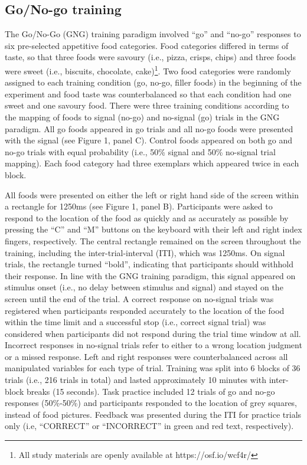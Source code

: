 \documentclass[man,floatsintext]{apa6}
\let\rmarkdownfootnote\footnote%
\def\footnote{\protect\rmarkdownfootnote}
\begin{document}
\hypertarget{gng}{%
\subsection{Go/No-go training}\label{gng}}

\par

The Go/No-Go (GNG) training paradigm involved \enquote{go} and \enquote{no-go} responses to six pre-selected appetitive food categories. Food categories differed in terms of taste, so that three foods were savoury (i.e., pizza, crisps, chips) and three foods were sweet (i.e., biscuits, chocolate, cake)\footnote{All study materials are openly available at https://osf.io/wcf4r/}. Two food categories were randomly assigned to each training condition (go, no-go, filler foods) in the beginning of the experiment and food taste was counterbalanced so that each condition had one sweet and one savoury food. There were three training conditions according to the mapping of foods to signal (no-go) and no-signal (go) trials in the GNG paradigm. All go foods appeared in go trials and all no-go foods were presented with the signal (see Figure 1, panel C). Control foods appeared on both go and no-go trials with equal probability (i.e., 50\% signal and 50\% no-signal trial mapping). Each food category had three exemplars which appeared twice in each block.

\par

All foods were presented on either the left or right hand side of the screen within a rectangle for 1250ms (see Figure 1, panel B). Participants were asked to respond to the location of the food as quickly and as accurately as possible by pressing the \enquote{C} and \enquote{M} buttons on the keyboard with their left and right index fingers, respectively. The central rectangle remained on the screen throughout the training, including the inter-trial-interval (ITI), which was 1250ms. On signal trials, the rectangle turned \enquote{bold}, indicating that participants should withhold their response. In line with the GNG training paradigm, this signal appeared on stimulus onset (i.e., no delay between stimulus and signal) and stayed on the screen until the end of the trial. A correct response on no-signal trials was registered when participants responded accurately to the location of the food within the time limit and a successful stop (i.e., correct signal trial) was considered when participants did not respond during the trial time window at all. Incorrect responses in no-signal trials refer to either to a wrong location judgment or a missed response.
Left and right responses were counterbalanced across all manipulated variables for each type of trial. Training was split into 6 blocks of 36 trials (i.e., 216 trials in total) and lasted approximately 10 minutes with inter-block breaks (15 seconds). Task practice included 12 trials of go and no-go responses (50\%-50\%) and participants responded to the location of grey squares, instead of food pictures. Feedback was presented during the ITI for practice trials only (i.e, \enquote{CORRECT} or \enquote{INCORRECT} in green and red text, respectively).
\end{document}

